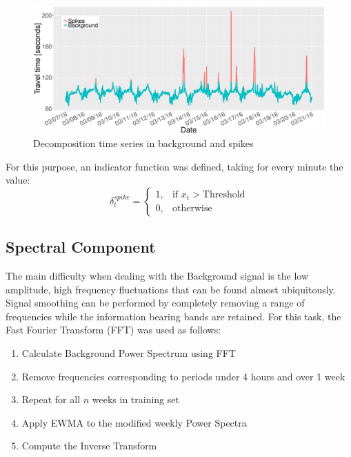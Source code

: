 \documentclass[conference, letterpaper]{IEEEtran}
\begin{document}
\begin{figure}[htbp]
	\centering
	\includegraphics[width=\linewidth]{BS.pdf}
	\caption{ Decomposition time series in background and spikes }
	\label{fig:Background}
\end{figure}

For this purpose, an indicator function was defined, taking for every minute the value:
\begin{equation}
    \delta_t^{spike}=
    \begin{cases}
      1, & \text{if } x_t > \text{Threshold}\\
      0, & \text{otherwise}
    \end{cases}
    \label{delta}
  \end{equation}

\subsection{Spectral Component}
The main difficulty when dealing with the Background signal is the low amplitude, high frequency fluctuations that can be found almost ubiquitously. 
Signal smoothing can be performed by completely removing a range of frequencies while the information bearing bands are retained. For this task, the Fast Fourier Transform (FFT) \cite{FFT} was used as follows:

\begin{enumerate}

	\item Calculate Background Power Spectrum using FFT
	\item Remove frequencies corresponding to periods under 4 hours and over 1 week
	\item Repeat for all $n$ weeks in training set
    \item Apply EWMA to the modified weekly Power Spectra
	\item Compute the Inverse Transform

\end{enumerate}
\end{document}
